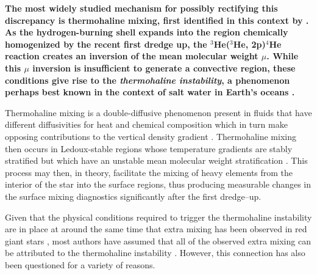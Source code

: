 \textbf{The most widely studied mechanism for possibly rectifying this discrepancy is thermohaline mixing, first identified in this context by \citet{charbonnel_thermohaline_2007}.
As the hydrogen-burning shell expands into the region chemically homogenized by the recent first dredge up, the $^3$He($^3$He, 2p)$^4$He reaction creates an inversion of the mean molecular weight $\mu$. While this $\mu$ inversion is insufficient to generate a convective region, 
these conditions give rise to the 
\textit{thermohaline instability}, a phenomenon perhaps best known in the context of salt water in Earth's oceans \citep{Stern1960,baines_gill_1969}.} 
%

Thermohaline mixing is a double-diffusive phenomenon present in fluids that have different diffusivities for heat and chemical composition which in turn make opposing contributions to the vertical density gradient \citep{Turner:1974}. Thermohaline mixing then occurs in Ledoux-stable regions whose temperature gradients are stably stratified but which have an unstable mean molecular weight stratification \citep[see][for a full review]{garaud_DDC_review_2018}. This process may then, in theory, facilitate the mixing of heavy elements from the interior of the star into the surface regions, thus producing measurable changes in the surface mixing diagnostics significantly after the first dredge--up.

Given that the physical conditions required to trigger the thermohaline instability are in place at around the same time that extra mixing has been observed in red giant stars \citep[e.g.][]{Lagarde2015}, 
most authors have assumed that all of the observed extra mixing can be attributed to the thermohaline instability \citep[e.g.][]{Kirby2016, Charbonnel2020, Magrini2021a}. However, this connection has also been questioned for a variety of reasons. 

